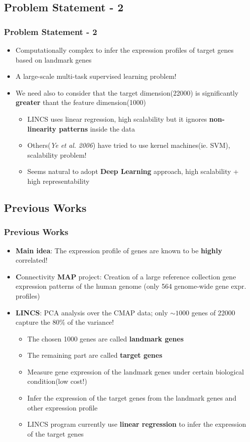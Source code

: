 \documentclass[professionalfont]{beamer}
\begin{document}
  \subsection{Problem Statement - 2}
	\begin{frame}
	 \frametitle{Problem Statement - 2}
	 \begin{itemize}
	  \item Computationally complex to infer the expression profiles of target genes based on landmark genes
	  \item A large-scale multi-task supervised learning problem!
	  \item We need also to consider that the target dimension(22000) is significantly \textbf{greater} thant the feature dimension(1000)
	  \begin{itemize}
	    \item LINCS uses linear regression, high scalability but it ignores \textbf{non-linearity patterns} inside the data
	    \item Others(\textit{Ye et al. 2006}) have tried to use kernel machines(ie. SVM), scalability problem!
	    \item Seems natural to adopt \textbf{Deep Learning} approach, high scalability + high representability
	  \end{itemize}
	 \end{itemize}
	\end{frame}

  \subsection{Previous Works}
  \begin{frame}
	\frametitle{Previous Works}
	  \begin{itemize}
	   \item \textbf{Main idea}: The expression profile of genes are known to be \textbf{highly} correlated!
	   \item \textbf{C}onnectivity \textbf{MAP} project: Creation of a large reference collection gene expression patterns of the human genome
     (only 564 genome-wide gene expr. profiles)
	   \item \textbf{LINCS}: PCA analysis over the CMAP data; only $\sim 1000$ genes of 22000 capture the 80\% of the variance!
	     \begin{itemize}
	      \item The chosen 1000 genes are called \textbf{landmark genes}
	      \item The remaining part are called \textbf{target genes}
	      \item Measure gene expression of the landmark genes under certain biological condition(low cost!)
	      \item Infer the expression of the target genes from the landmark genes and other expression profile
	      \item LINCS program currently use \textbf{linear regression} to infer the expression of the target genes
	     \end{itemize}
	 \end{itemize}
      \end{frame}
\end{document}
